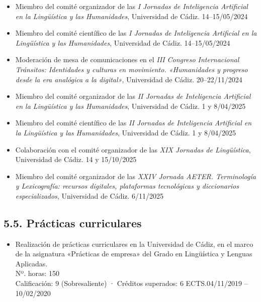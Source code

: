 \begin{enumerate}[label=\alph*)]
\begin{itemize}
  \item Miembro del comité organizador de las \textit{I Jornadas de Inteligencia Artificial en la Lingüística y las Humanidades}, Universidad de Cádiz. \hfill 14–15/05/2024

  \item Miembro del comité científico de las \textit{I Jornadas de Inteligencia Artificial en la Lingüística y las Humanidades}, Universidad de Cádiz. \hfill 14–15/05/2024

    \item Moderación de mesa de comunicaciones en el \textit{III Congreso Internacional Tránsitos: Identidades y culturas en movimiento. «Humanidades y progreso desde la era analógica a la digital»}, Universidad de Cádiz. \hfill 20–22/11/2024

  \item Miembro del comité organizador de las \textit{II Jornadas de Inteligencia Artificial en la Lingüística y las Humanidades}, Universidad de Cádiz. \hfill 1 y 8/04/2025

  \item Miembro del comité científico de las \textit{II Jornadas de Inteligencia Artificial en la Lingüística y las Humanidades}, Universidad de Cádiz. \hfill 1 y 8/04/2025

    \item Colaboración con el comité organizador de las \textit{XIX Jornadas de Lingüística}, Universidad de Cádiz. \hfill 14 y 15/10/2025

    \item Miembro del comité organizador de las \textit{XXIV Jornada AETER. Terminología y Lexicografía: recursos digitales, plataformas tecnológicas y diccionarios especializados}, Universidad de Cádiz. \hfill 6/11/2025
\end{itemize}

\subsection*{5.5. Prácticas curriculares}


\begin{itemize}
\item Realización de prácticas curriculares en la Universidad de Cádiz, en el marco de la asignatura «Prácticas de empresa» del Grado en Lingüística y Lenguas Aplicadas.\\
Nº. horas: 150\\
Calificación: 9 (Sobresaliente) · Créditos superados: 6 ECTS.\hfill 04/11/2019 – 10/02/2020\\
\end{itemize}



\end{enumerate}
